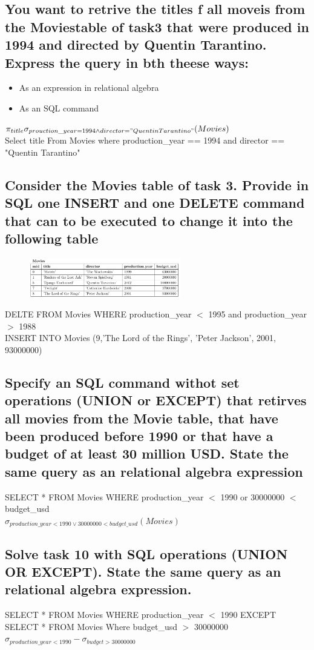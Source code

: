 \documentclass[12pt, a4paper]{article}
\begin{document}
		\subsection{You want to retrive the titles f all moveis from the Moviestable of task3 that were produced in 1994 and directed by Quentin Tarantino. Express the query in bth theese ways:}
			\begin{itemize}
				\item As an expression in relational algebra
				\item As an SQL command
			\end{itemize}
				$\pi_{title}\sigma_{prouction\_year = 1994 \land director =  "Quentin Tarantino"}(Movies)$\\
				Select title From Movies where production\_year == 1994 and director == "Quentin Tarantino"
		\subsection{Consider the Movies table of task 3. Provide in SQL one INSERT and one DELETE command that can to be executed to change it into the following table}
			\begin{figure}[h!]
				\centering
				\includegraphics[width=250px]{images/47,10.png}
				\label{}
				\caption{}
			\end{figure}
			DELTE FROM Movies WHERE production\_year $<$ 1995 and production\_year $>$ 1988\\
			INSERT INTO Movies (9,'The Lord of the Rings', 'Peter Jackson', 2001, 93000000)
		\subsection{Specify an SQL command withot set operations (UNION or EXCEPT) that retirves all movies from the Movie table, that have been produced before 1990 or that have a budget of at least 30 million USD. State the same query as an relational algebra expression}
			SELECT * FROM Movies WHERE production\_year $<$ 1990 or 30000000 $<$ budget\_usd\\
			$\sigma_{production\_year < 1990 \lor 30000000 < budget\_usd}(Movies)$
		\subsection{Solve task 10 with SQL operations (UNION OR EXCEPT). State the same query as an relational algebra expression.}
			SELECT * FROM Movies WHERE production\_year $<$ 1990 EXCEPT SELECT * FROM Movies Where budget\_usd $>$ 30000000\\
			$\sigma_{production\_year < 1990} - \sigma_{budget > 30000000}$
\end{document}

